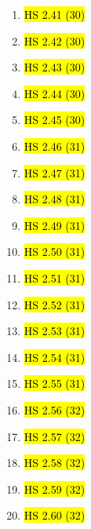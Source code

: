 \documentclass[11pt]{article}
\newenvironment{note}{\begin{enumerate}[leftmargin=1em,topsep=0pt,noitemsep]}{\end{enumerate}}
\begin{document}
\begin{spacing}{1.1}
\begin{note}
\item \hl{HS 2.41 (30)}
\item \hl{HS 2.42 (30)}
\item \hl{HS 2.43 (30)}
\item \hl{HS 2.44 (30)}
\item \hl{HS 2.45 (30)}
\item \hl{HS 2.46 (31)}
\item \hl{HS 2.47 (31)}
\item \hl{HS 2.48 (31)}
\item \hl{HS 2.49 (31)}
\item \hl{HS 2.50 (31)}
\item \hl{HS 2.51 (31)}
\item \hl{HS 2.52 (31)}
\item \hl{HS 2.53 (31)}
\item \hl{HS 2.54 (31)}
\item \hl{HS 2.55 (31)}
\item \hl{HS 2.56 (32)}
\item \hl{HS 2.57 (32)}
\item \hl{HS 2.58 (32)}
\item \hl{HS 2.59 (32)}
\item \hl{HS 2.60 (32)}



\end{note}
\end{spacing}
\end{document}
